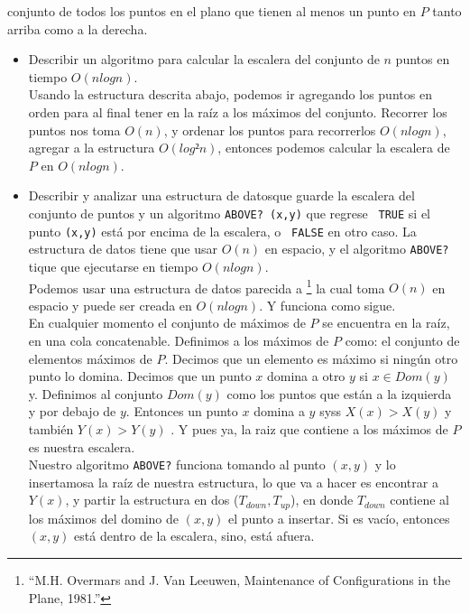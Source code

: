 \documentclass[spanish,12pt,letterpaper]{article}
\begin{document}
\begin{enumerate}
  conjunto de todos los puntos en el plano que tienen al menos un punto en $P$
  tanto arriba como a la derecha.
  \begin{itemize}
  \item Describir un algoritmo para calcular la escalera del conjunto de $n$
    puntos en tiempo $O(nlogn)$.\\
    Usando la estructura descrita abajo, podemos ir agregando los puntos en orden
    para al final tener en la raíz a los máximos del conjunto. Recorrer los
    puntos nos toma $O(n)$, y ordenar los puntos para recorrerlos $O(nlogn)$,
    agregar a la estructura $O(log²n)$, entonces podemos calcular la escalera de
    $P$ en $O(nlogn)$.
  \item Describir y analizar una estructura de datosque guarde la escalera del
    conjunto de puntos y un algoritmo \texttt{ABOVE? (x,y)} que regrese \texttt{
      TRUE} si el punto \texttt{(x,y)} está por encima de la escalera, o \texttt{
      FALSE} en otro caso. La estructura de datos tiene que usar $O(n)$ en
    espacio, y el algoritmo \texttt{ABOVE?} tique que ejecutarse en tiempo
    $O(nlogn)$.\\
    Podemos usar una estructura de datos parecida a \footnote{``M.H. Overmars and
      J. Van Leeuwen, Maintenance of Configurations in the Plane, 1981.''} la
    cual toma $O(n)$ en espacio y puede ser creada en $O(nlogn)$. Y funciona como
    sigue.\\
    En cualquier momento el conjunto de máximos de $P$ se encuentra en la raíz,
    en una cola concatenable.
    Definimos a los máximos de $P$ como: el conjunto de elementos máximos de $P$.
    Decimos que un elemento es máximo si ningún otro punto lo domina. Decimos que
    un punto $x$ domina a otro $y$ si $x \in Dom(y)$ y. Definimos al conjunto
    $Dom(y)$ como los puntos que están a la izquierda y por debajo de $y$.
    Entonces un punto $x$ domina a $y$ syss $X(x) > X(y)$ y también $Y(x) > Y(y)$
    . Y pues ya, la raiz que contiene a los máximos de $P$ es nuestra escalera.\\
    Nuestro algoritmo \texttt{ABOVE?} funciona tomando al punto $(x,y)$ y lo
    insertamosa la raíz de nuestra estructura, lo que va a hacer es encontrar a
    $Y(x)$, y partir la estructura en dos ($T_{down}, T_{up}$), en donde $T_{down}$
    contiene al los máximos del domino de $(x,y)$ el punto a insertar. Si es
    vacío, entonces $(x,y)$ está dentro de la escalera, sino, está afuera.
  \end{itemize}
\end{enumerate}
\end{document}
